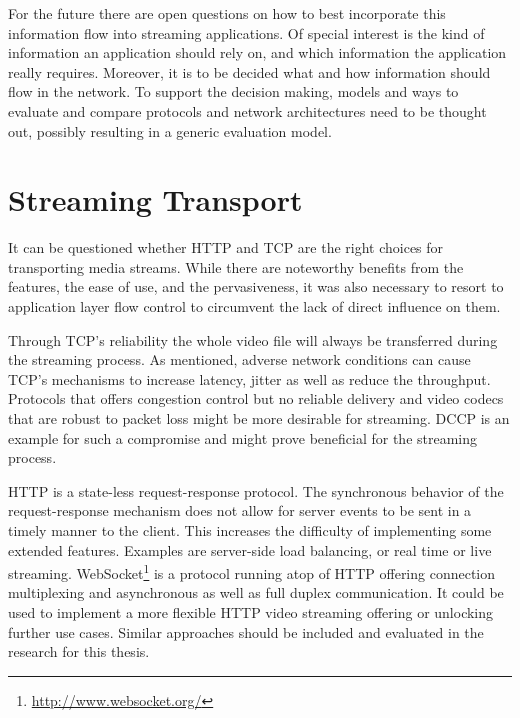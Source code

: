 For the future there are open questions on how to best incorporate this information flow into streaming applications. Of special interest is the kind of information an application should rely on, and which information the application really requires. Moreover, it is to be decided what and how information should flow in the network. To support the decision making, models and ways to evaluate and compare protocols and network architectures need to be thought out, possibly resulting in a generic evaluation model.





\section{Streaming Transport}

It can be questioned whether HTTP and TCP are the right choices for transporting media streams.
While there are noteworthy benefits from the features, the ease of use, and the pervasiveness, it was also necessary to resort to application layer flow control to circumvent the lack of direct influence on them.

Through TCP's reliability the whole video file will always be transferred during the streaming process. As mentioned, adverse network conditions can cause TCP's mechanisms to increase latency, jitter as well as reduce the throughput. Protocols that offers congestion control but no reliable delivery and video codecs that are robust to packet loss might be more desirable for streaming. DCCP \cite{kohler2006designing} is an example for such a compromise and might prove beneficial for the streaming process.

HTTP is a state-less request-response protocol. The synchronous behavior of the request-response mechanism does not allow for server events to be sent in a timely manner to the client. This increases the difficulty of implementing some extended features. Examples are server-side load balancing, or real time or live streaming. WebSocket\footnote{\url{http://www.websocket.org/}} \cite{ietf2011websocket} is a protocol running atop of HTTP offering connection multiplexing and asynchronous as well as full duplex communication. It could be used to implement a more flexible HTTP video streaming offering or unlocking further use cases. Similar approaches should be included and evaluated in the research for this thesis.

